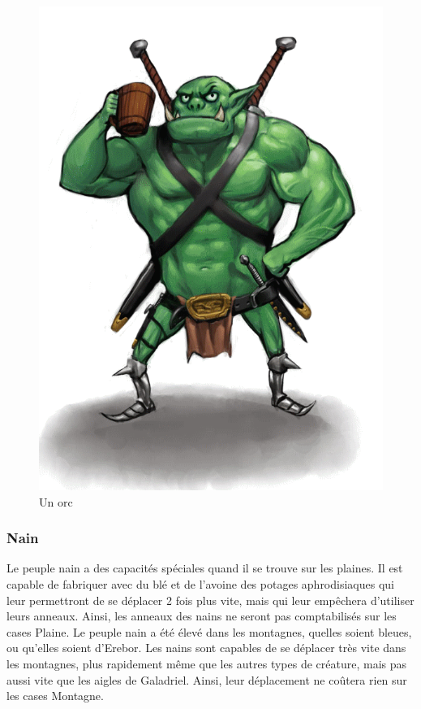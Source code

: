 \begin{figure}[!h]
\centering
\includegraphics[scale=0.10]{img/orc.png}
\caption{Un orc}
\end{figure}

\subsubsection{Nain}
Le peuple nain a des capacités spéciales quand il se trouve sur les plaines. Il est capable de fabriquer avec du blé et de l'avoine des potages aphrodisiaques qui leur permettront de se déplacer 2 fois plus vite, mais qui leur empêchera d'utiliser leurs anneaux.
\newline
 Ainsi, les anneaux des nains ne seront pas comptabilisés sur les cases Plaine.
\newline
\newline
Le peuple nain a été élevé dans les montagnes, quelles soient bleues, ou qu'elles soient d'Erebor. Les nains sont capables de se déplacer très vite dans les montagnes, plus rapidement même que les autres types de créature, mais pas aussi vite que les aigles de Galadriel.
\newline Ainsi, leur déplacement ne coûtera rien sur les cases Montagne.


